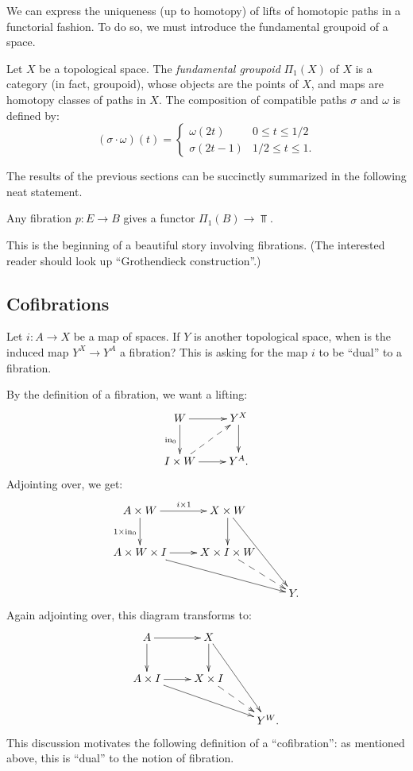 We can express the uniqueness (up to homotopy) of lifts of homotopic paths in a functorial fashion.
To do so, we must introduce the fundamental groupoid of a space.
\begin{definition}
    Let $X$ be a topological space.
    The \emph{fundamental groupoid} $\Pi_1(X)$ of $X$ is a category (in fact, groupoid),
    whose objects are the points of $X$, and maps are homotopy classes of paths in $X$.
    The composition of compatible paths $\sigma$ and $\omega$ is defined by:
    \begin{equation*}
	(\sigma\cdot\omega)(t) = \begin{cases}
	    \omega(2t) & 0\leq t\leq 1/2\\
	    \sigma(2t - 1) & 1/2\leq t\leq 1.
	\end{cases}
    \end{equation*}
\end{definition}
The results of the previous sections can be succinctly summarized in the following neat statement.
\begin{prop}
    Any fibration $p:E\to B$ gives a functor $\Pi_1(B)\to \Top$.
\end{prop}
This is the beginning of a beautiful story involving fibrations.
(The interested reader should look up ``Grothendieck construction''.)

\subsection{Cofibrations}
Let $i:A\to X$ be a map of spaces.
If $Y$ is another topological space, when is the induced map $Y^X\to Y^A$ a fibration?
This is asking for the map $i$ to be ``dual'' to a fibration.

By the definition of a fibration, we want a lifting:
\begin{equation*}
    \xymatrix{
	W\ar[r]\ar[d]_{\mathrm{in}_0} & Y^X\ar[d]\\
	I\times W\ar@{-->}[ur]\ar[r] & Y^A.
    }
\end{equation*}
Adjointing over, we get:
\begin{equation*}
    \xymatrix{
	A\times W\ar[r]^{i\times 1}\ar[d]_{1\times \mathrm{in}_0} & X\times W\ar[d]\ar[ddr]& \\
	A\times W\times I \ar[r]\ar[drr] & X\times I\times W\ar@{-->}[dr] & \\
	& & Y.
    }
\end{equation*}
Again adjointing over, this diagram transforms to:
\begin{equation*}
    \xymatrix{
	A\ar[r]\ar[d] & X\ar[d]\ar[ddr] & \\
	A\times I\ar[r]\ar[drr] & X\times I\ar@{-->}[dr] & \\
	& & Y^W.
    }
\end{equation*}
This discussion motivates the following definition of a ``cofibration'':
as mentioned above, this is ``dual'' to the notion of fibration.

